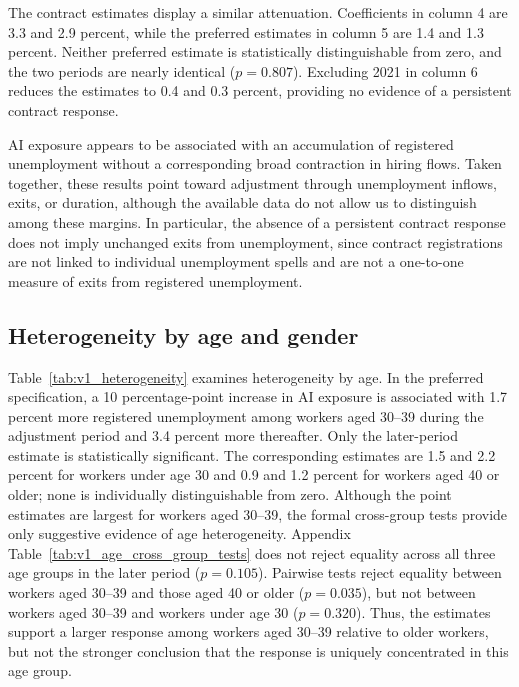 The contract estimates display a similar attenuation. Coefficients in column 4 are 3.3 and 2.9 percent, while the preferred estimates in column 5 are 1.4 and 1.3 percent. Neither preferred estimate is statistically distinguishable from zero, and the two periods are nearly identical (\(p=0.807\)). Excluding 2021 in column 6 reduces the estimates to 0.4 and 0.3 percent, providing no evidence of a persistent contract response. 

AI exposure appears to be associated with an accumulation of registered unemployment without a corresponding broad contraction in hiring flows. Taken together, these results point toward adjustment through unemployment inflows, exits, or duration, although the available data do not allow us to distinguish among these margins. In particular, the absence of a persistent contract response does not imply unchanged exits from unemployment, since contract registrations are not linked to individual unemployment spells and are not a one-to-one measure of exits from registered unemployment.



\subsection{Heterogeneity by age and gender}
\label{sec:v1_heterogeneity}


Table~\ref{tab:v1_heterogeneity} examines heterogeneity by age. In the preferred specification, a 10 percentage-point increase in AI exposure is associated with 1.7 percent more registered unemployment among workers aged 30--39 during the adjustment period and 3.4 percent more thereafter. Only the later-period estimate is statistically significant. The corresponding estimates are 1.5 and 2.2 percent for workers under age 30 and 0.9 and 1.2 percent for workers aged 40 or older; none is individually distinguishable from zero. Although the point estimates are largest for workers aged 30--39, the formal cross-group tests provide only suggestive evidence of age heterogeneity. Appendix Table~\ref{tab:v1_age_cross_group_tests} does not reject equality across all three age groups in the later period (\(p=0.105\)). Pairwise tests reject equality between workers aged 30--39 and those aged 40 or older (\(p=0.035\)), but not between workers aged 30--39 and workers under age 30 (\(p=0.320\)). Thus, the estimates support a larger response among workers aged 30--39 relative to older workers, but not the stronger conclusion that the response is uniquely concentrated in this age group.

